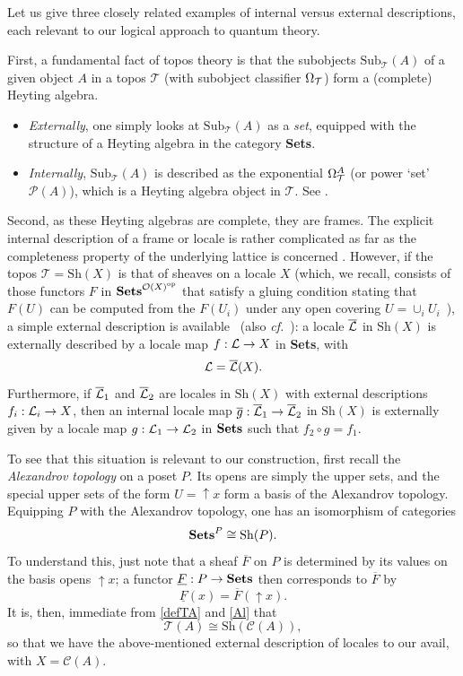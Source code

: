 \documentclass[11pt]{article}
\newcommand{\beq}{\begin{equation}}
\newcommand{\eeq}{\end{equation}}
\newcommand{\Sets}{\mbox{\textbf{Sets}}}
\newcommand{\raw}{\rightarrow} \newcommand{\rat}{\mapsto}
\newcommand{\er}{\eqref}
\newcommand{\CA}{{\mathcal A}} \newcommand{\CB}{{\mathcal B}}
\newcommand{\CO}{{\mathcal O}} \newcommand{\CP}{{\mathcal P}}
\newcommand{\CT}{{\mathcal T}} \newcommand{\CV}{{\mathcal V}}
\newcommand{\alg}[1]{\ensuremath{#1}}
\newcommand{\Sh}{\ensuremath{\mathrm{Sh}}}
\newcommand{\context}{\ensuremath{\mathcal{C}}}
\newcommand{\asstopos}{\ensuremath{\mathcal{T}}}
\renewcommand{\CA}{\mathcal{C}(A)}
\renewcommand{\CA}{\context(\alg{A})}
\begin{document}
Let us give three closely related examples of internal versus external
descriptions, each relevant to our logical approach to quantum theory.

First, a fundamental fact of topos theory is
that the subobjects $\mathrm{Sub}_{\CT}(A)$ of a given object $A$ in a topos
$\CT$ (with subobject classifier $\Om_{\CT}$) form a (complete) Heyting algebra.
\begin{itemize}
\item
 {\it Externally}, one simply looks at $\mathrm{Sub}_{\CT}(A)$
as a {\it set}, equipped with the structure of a Heyting algebra in the
category \Sets.
\item {\it Internally}, $\mathrm{Sub}_{\CT}(A)$ is described as the
exponential $\Om_{\CT}^A$ (or power `set' $\CP(A)$), which is a Heyting algebra
object in $\CT$. See
\cite[p.\ 201]{maclanemoerdijk92}.
\end{itemize}

Second, as these Heyting algebras are complete, they are frames. The
explicit internal description of a frame or locale is rather complicated as far
as the completeness property of the underlying lattice is concerned
\cite{borceux3}. However, if the topos $\CT = \Sh(X)$ is that of
sheaves on a locale $X$ (which, we recall, consists of
those functors $F$ in $\Sets^{\CO(X)^{\mathrm{op}}}$ that satisfy a
gluing condition stating that $F(U)$ can be computed from the $F(U_i)$
under any open covering $U=\cup_i
U_i$~\cite[Ch.~II]{maclanemoerdijk92}), a simple external description
is available~\cite{johnstoneloc,joyaltierney84} (also {\it cf.}\ \cite[\S
C1.6]{johnstone02b}): a locale $\overline{{\mathcal L}}$ in $\Sh(X)$ is externally described by
a locale map $f: \CL\raw X$ in \Sets, with
\beq \CL=\overline\CL(X).\label{extL}\eeq
Furthermore, if $\overline{{\mathcal L}}_1$ and $\overline{{\mathcal L}}_2$ are locales in
$\Sh(X)$ with external descriptions $f_i: \CL_i\raw X$, then
an internal locale map $\overline{g}:\overline\CL_1\raw \overline\CL_2$ in 
$\Sh(X)$ is externally given by a
locale map
$g:\CL_1\raw \CL_2$ in $\Sets$ such that $f_2\circ g=f_1$.

 To see  that this situation is relevant to our
construction, first recall the  {\it Alexandrov topology} on a poset $P$.
Its opens  are simply the upper sets,
and the special upper sets of the form $U=\mathop{\uparrow}\!  x$
 form a basis of the Alexandrov topology. Equipping $P$ with the Alexandrov
topology, one has an isomorphism of categories
\begin{equation}\label{Al}
  \Sets^P\cong \Sh(P).
\end{equation}
 To understand this, just
note that a sheaf $\overline{F}$  on $P$ is determined by its values on
the basis opens $\mathop{\uparrow}\!  x$; a functor  $\underline{F}:P\raw\Sets$
then corresponds to $\overline{F}$ by 
\beq \underline{F}(x)=\overline{F}(\mathop{\uparrow}\!
x). \label{FF}\eeq
It is, then, immediate from \er{defTA} and  \er{Al} that
\beq
\asstopos(\alg{A})\cong \Sh(\CA),\label{TASh}
\eeq
so that we have the above-mentioned external description of locales to our
avail, with $X=\CA$.
\end{document}
